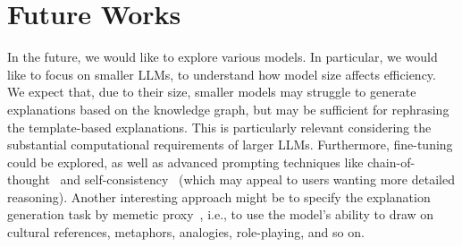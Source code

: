 \section{Future Works}


In the future, we would like to explore various models. In particular, we would like to focus on smaller LLMs, to understand how model size affects efficiency. We expect that, due to their size, smaller models may struggle to generate explanations based on the knowledge graph, but may be sufficient for rephrasing the template-based explanations. This is particularly relevant considering the substantial computational requirements of larger LLMs. Furthermore, fine-tuning could be explored, as well as advanced prompting techniques like chain-of-thought~\cite{weichain} and self-consistency~\cite{wang2022self} (which may appeal to users wanting more detailed reasoning). Another interesting approach might be to specify the explanation generation task by memetic proxy~\cite{reynolds2021prompt}, i.e., to use the model's ability to draw on cultural references, metaphors, analogies, role-playing, and so on. %



